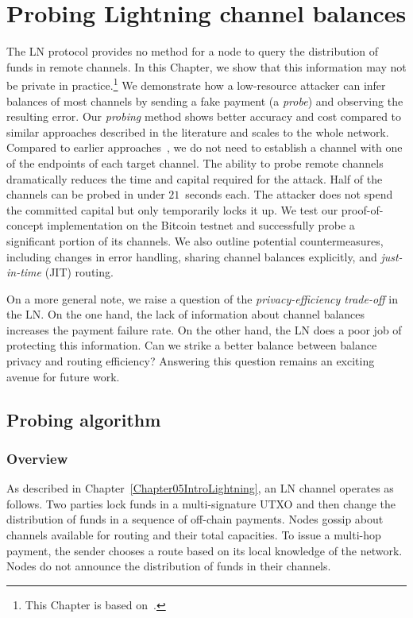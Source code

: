 \chapter{Probing Lightning channel balances}

\label{Chapter06LNprobing}

The LN protocol provides no method for a node to query the distribution of funds in remote channels.
In this Chapter, we show that this information may not be private in practice.\footnote{This Chapter is based on~\cite{Tikhomirov2020}.}
We demonstrate how a low-resource attacker can infer balances of most channels by sending a fake payment (a \textit{probe}) and observing the resulting error.
Our \textit{probing} method shows better accuracy and cost compared to similar approaches described in the literature and scales to the whole network.
Compared to earlier approaches~\cite{HerreraJoancomarti2019, Dam2019}, we do not need to establish a channel with one of the endpoints of each target channel.
The ability to probe remote channels dramatically reduces the time and capital required for the attack.
Half of the channels can be probed in under $21$~seconds each.
The attacker does not spend the committed capital but only temporarily locks it up.
We test our proof-of-concept implementation on the Bitcoin testnet and successfully probe a significant portion of its channels.
We also outline potential countermeasures, including changes in error handling, sharing channel balances explicitly, and \textit{just-in-time} (JIT) routing.

On a more general note, we raise a question of the \textit{privacy-efficiency trade-off} in the LN\@.
On the one hand, the lack of information about channel balances increases the payment failure rate.
On the other hand, the LN does a poor job of protecting this information.
Can we strike a better balance between balance privacy and routing efficiency?
Answering this question remains an exciting avenue for future work.


\section{Probing algorithm}
\label{sec:probing}

\subsection{Overview}

As described in Chapter~\ref{Chapter05IntroLightning}, an LN channel operates as follows.
Two parties lock funds in a multi-signature UTXO and then change the distribution of funds in a sequence of off-chain payments.
Nodes gossip about channels available for routing and their total capacities.
To issue a multi-hop payment, the sender chooses a route based on its local knowledge of the network.
Nodes do not announce the distribution of funds in their channels.

